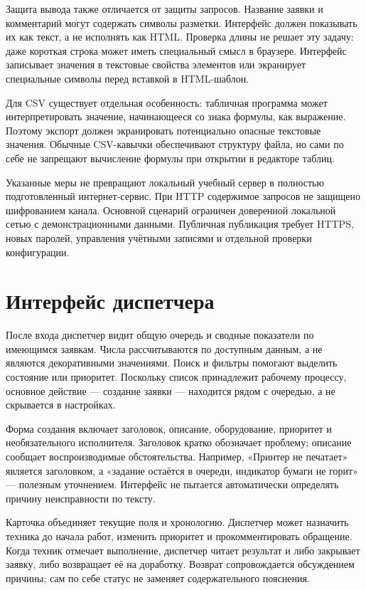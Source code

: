 \documentclass{timcw}
\begin{document}
Защита вывода также отличается от защиты запросов. Название заявки и комментарий могут содержать символы разметки. Интерфейс должен показывать их как текст, а не исполнять как HTML. Проверка длины не решает эту задачу: даже короткая строка может иметь специальный смысл в браузере. Интерфейс записывает значения в текстовые свойства элементов или экранирует специальные символы перед вставкой в HTML-шаблон.

Для CSV существует отдельная особенность: табличная программа может интерпретировать значение, начинающееся со знака формулы, как выражение. Поэтому экспорт должен экранировать потенциально опасные текстовые значения. Обычные CSV-кавычки обеспечивают структуру файла, но сами по себе не запрещают вычисление формулы при открытии в редакторе таблиц.

Указанные меры не превращают локальный учебный сервер в полностью подготовленный интернет-сервис. При HTTP содержимое запросов не защищено шифрованием канала. Основной сценарий ограничен доверенной локальной сетью с демонстрационными данными. Публичная публикация требует HTTPS, новых паролей, управления учётными записями и отдельной проверки конфигурации.

\section{Интерфейс диспетчера}

После входа диспетчер видит общую очередь и сводные показатели по имеющимся заявкам. Числа рассчитываются по доступным данным, а не являются декоративными значениями. Поиск и фильтры помогают выделить состояние или приоритет. Поскольку список принадлежит рабочему процессу, основное действие — создание заявки — находится рядом с очередью, а не скрывается в настройках.

Форма создания включает заголовок, описание, оборудование, приоритет и необязательного исполнителя. Заголовок кратко обозначает проблему; описание сообщает воспроизводимые обстоятельства. Например, «Принтер не печатает» является заголовком, а «задание остаётся в очереди, индикатор бумаги не горит» — полезным уточнением. Интерфейс не пытается автоматически определять причину неисправности по тексту.

Карточка объединяет текущие поля и хронологию. Диспетчер может назначить техника до начала работ, изменить приоритет и прокомментировать обращение. Когда техник отмечает выполнение, диспетчер читает результат и либо закрывает заявку, либо возвращает её на доработку. Возврат сопровождается обсуждением причины; сам по себе статус не заменяет содержательного пояснения.
\end{document}

